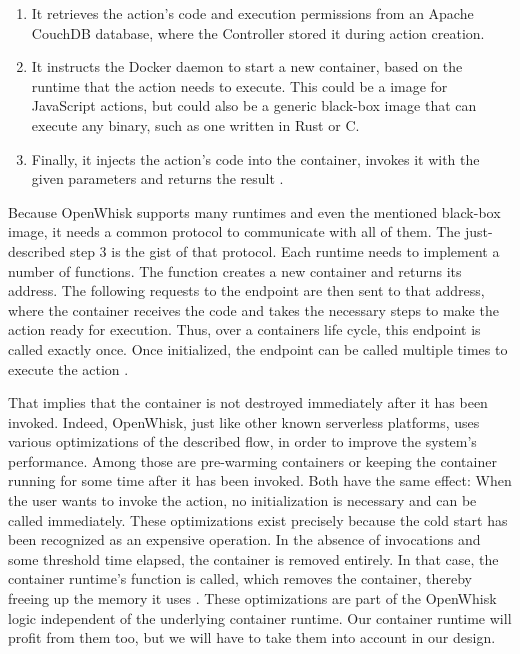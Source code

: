 \begin{enumerate}
    \item It retrieves the action's code and execution permissions from an Apache CouchDB database, where the Controller stored it during action creation.
    \item It instructs the Docker daemon to start a new container, based on the runtime that the action needs to execute. This could be a  image for JavaScript actions, but could also be a generic  black-box image that can execute any binary, such as one written in Rust or C.
    \item Finally, it injects the action's code into the container, invokes it with the given parameters and returns the result \cite{OpenWhiskSystemDesign}.
\end{enumerate}

Because OpenWhisk supports many runtimes and even the mentioned black-box image, it needs a common protocol to communicate with all of them. The just-described step 3 is the gist of that protocol. Each runtime needs to implement a number of functions. The  function creates a new container and returns its address. The following requests to the  endpoint are then sent to that address, where the container receives the code and takes the necessary steps to make the action ready for execution. Thus, over a containers life cycle, this endpoint is called exactly once. Once initialized, the  endpoint can be called multiple times to execute the action \cite{OpenWhiskSystemDesign}.

That implies that the container is not destroyed immediately after it has been invoked. Indeed, OpenWhisk, just like other known serverless platforms, uses various optimizations of the described flow, in order to improve the system's performance. Among those are pre-warming containers or keeping the container running for some time after it has been invoked. Both have the same effect: When the user wants to invoke the action, no initialization is necessary and  can be called immediately. These optimizations exist precisely because the cold start has been recognized as an expensive operation. In the absence of invocations and some threshold time elapsed, the container is removed entirely. In that case, the container runtime's  function is called, which removes the container, thereby freeing up the memory it uses \cite{OpenWhiskSystemDesign}. These optimizations are part of the OpenWhisk logic independent of the underlying container runtime. Our container runtime will profit from them too, but we will have to take them into account in our design.

